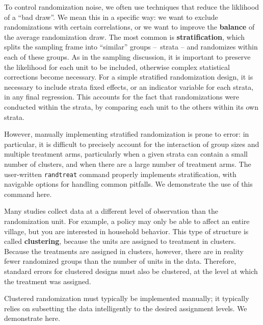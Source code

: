 To control randomization noise, we often use techniques
that reduce the liklihood of a ``bad draw''.\cite{athey2017econometrics}
We mean this in a specific way: we want to exclude
randomizations with certain correlations,
or we want to improve the \textbf{balance}
of the average randomization draw.\cite{bruhn2009pursuit}
The most common is \textbf{stratification},
which splits the sampling frame into ``similar'' groups – strata –
and randomizes within each of these groups.
As in the sampling discussion, it is important to
preserve the likelihood for each unit to be included,
otherwise complex statistical corrections become necessary.
For a simple stratified randomization design,
it is necessary to include strata fixed effects,
or an indicator variable for each strata, in any final regression.
This accounts for the fact that randomizations were conducted within the strata,
by comparing each unit to the others within its own strata.

However, manually implementing stratified randomization
is prone to error: in particular, it is difficult to precisely account
for the interaction of group sizes and multiple treatment arms,
particularly when a given strata can contain a small number of clusters,
and when there are a large number of treatment arms.\cite{carril2017dealing}
The user-written \texttt{randtreat} command
properly implements stratification,
with navigable options for handling common pitfalls.
We demonstrate the use of this command here.

{
}

Many studies collect data at a different level of observation than the randomization unit.
For example, a policy may only be able to affect an entire village,
but you are interested in household behavior.
This type of structure is called \textbf{clustering},
because the units are assigned to treatment in clusters.
Because the treatments are assigned in clusters, however,
there are in reality fewer randomized groups than the number of units in the data.
Therefore, standard errors for clustered designs must also be clustered,
at the level at which the treatment was assigned.

Clustered randomization must typically be implemented manually;
it typically relies on subsetting the data intelligently
to the desired assignment levels.
We demonstrate here.

{
}


